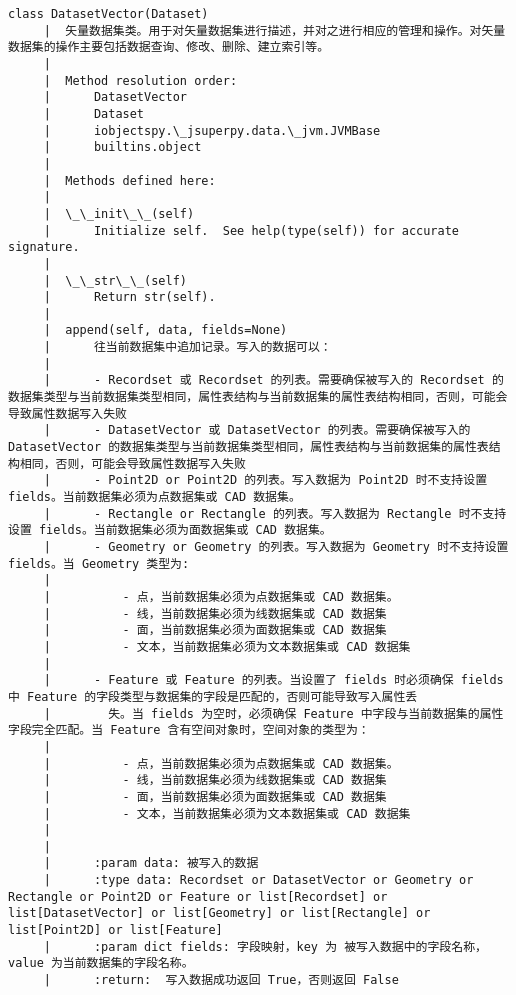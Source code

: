 \documentclass[11pt]{article}
\begin{document}
\begin{Verbatim}[commandchars=\\\{\}]
    class DatasetVector(Dataset)
     |  矢量数据集类。用于对矢量数据集进行描述，并对之进行相应的管理和操作。对矢量数据集的操作主要包括数据查询、修改、删除、建立索引等。
     |  
     |  Method resolution order:
     |      DatasetVector
     |      Dataset
     |      iobjectspy.\_jsuperpy.data.\_jvm.JVMBase
     |      builtins.object
     |  
     |  Methods defined here:
     |  
     |  \_\_init\_\_(self)
     |      Initialize self.  See help(type(self)) for accurate signature.
     |  
     |  \_\_str\_\_(self)
     |      Return str(self).
     |  
     |  append(self, data, fields=None)
     |      往当前数据集中追加记录。写入的数据可以：
     |      
     |      - Recordset 或 Recordset 的列表。需要确保被写入的 Recordset 的数据集类型与当前数据集类型相同，属性表结构与当前数据集的属性表结构相同，否则，可能会导致属性数据写入失败
     |      - DatasetVector 或 DatasetVector 的列表。需要确保被写入的 DatasetVector 的数据集类型与当前数据集类型相同，属性表结构与当前数据集的属性表结构相同，否则，可能会导致属性数据写入失败
     |      - Point2D or Point2D 的列表。写入数据为 Point2D 时不支持设置 fields。当前数据集必须为点数据集或 CAD 数据集。
     |      - Rectangle or Rectangle 的列表。写入数据为 Rectangle 时不支持设置 fields。当前数据集必须为面数据集或 CAD 数据集。
     |      - Geometry or Geometry 的列表。写入数据为 Geometry 时不支持设置 fields。当 Geometry 类型为:
     |      
     |          - 点，当前数据集必须为点数据集或 CAD 数据集。
     |          - 线，当前数据集必须为线数据集或 CAD 数据集
     |          - 面，当前数据集必须为面数据集或 CAD 数据集
     |          - 文本，当前数据集必须为文本数据集或 CAD 数据集
     |      
     |      - Feature 或 Feature 的列表。当设置了 fields 时必须确保 fields 中 Feature 的字段类型与数据集的字段是匹配的，否则可能导致写入属性丢
     |        失。当 fields 为空时，必须确保 Feature 中字段与当前数据集的属性字段完全匹配。当 Feature 含有空间对象时，空间对象的类型为：
     |      
     |          - 点，当前数据集必须为点数据集或 CAD 数据集。
     |          - 线，当前数据集必须为线数据集或 CAD 数据集
     |          - 面，当前数据集必须为面数据集或 CAD 数据集
     |          - 文本，当前数据集必须为文本数据集或 CAD 数据集
     |      
     |      
     |      :param data: 被写入的数据
     |      :type data: Recordset or DatasetVector or Geometry or Rectangle or Point2D or Feature or list[Recordset] or list[DatasetVector] or list[Geometry] or list[Rectangle] or list[Point2D] or list[Feature]
     |      :param dict fields: 字段映射，key 为 被写入数据中的字段名称，value 为当前数据集的字段名称。
     |      :return:  写入数据成功返回 True，否则返回 False

\end{Verbatim}
\end{document}
